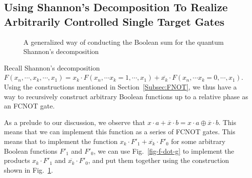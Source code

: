 %         
%         

\subsection{Using Shannon's Decomposition To Realize Arbitrarily Controlled Single Target Gates}
\label{Subsec:shannon}

\begin{figure}[t]
    \centering
      \scalebox{0.7} {
        
      }
    \caption{A generalized way of conducting the Boolean sum for the quantum Shannon's decomposition}
    \label{fig-bool-or}
\end{figure}


Recall Shannon's decomposition $F(x_n,\cdots,x_k,\cdots,x_1) = x_k \cdot F(x_n,\cdots x_k=1,\cdots,x_1) + \overline{x_k} \cdot F(x_n,\cdots x_k=0,\cdots,x_1)$.
Using the constructions mentioned in Section~\ref{Subsec:FNOT}, we thus have a way to recursively construct
arbitrary Boolean functions up to a relative phase as an FCNOT gate.

As a prelude to our discussion, we observe that $x \cdot a  + \overline{x} \cdot b = x \cdot a \oplus \overline{x} \cdot b$.
This means that we can implement this function as a series of FCNOT gates. This means that to implement the function $x_k \cdot {F'}_1 + \overline{x_k} \cdot {F'}_0$ for some arbitrary Boolean functions ${F'}_1$ and ${F'}_0$, we can use Fig.~\ref{fig-f-dot-g} to implement the products $x_k \cdot {F'}_1$ and $\overline{x_k} \cdot {F'}_0$, and put them together using the construction shown in Fig.~\ref{fig-bool-or}.


